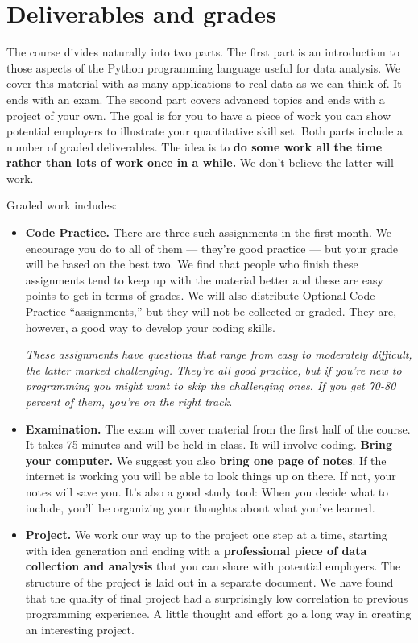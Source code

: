 \documentclass[11pt]{article}
\begin{document}
\section*{Deliverables and grades}

The course divides naturally into two parts.
The first part is an introduction to those aspects of the Python programming language
useful for data analysis.
We cover this material with as many applications to real data as we can think of.
It ends with an exam.
The second part covers advanced topics and ends with a project of your own.
The goal is for you to have a piece of work you can show potential employers to
illustrate your quantitative skill set.
Both parts include a number of graded deliverables.
The idea is to {\bf do some work all the time rather than lots of work once in a while.}
We don't believe the latter will work.

Graded work includes:
%
\begin{itemize}

\item {\bf Code Practice.\/}
There are three such assignments in the first month.
We encourage you do to all of them --- they're good practice ---
but your grade will be based on the best two. We find that people who finish these assignments
tend to keep up with the material better and these are easy points to get in terms of grades.
We will also distribute Optional Code Practice ``assignments,''
but they will not be collected or graded.
They are, however, a good way to develop your coding skills.

{\it These assignments have questions that range from easy to moderately difficult,
the latter marked {\it challenging\/}.
They're all good practice, but if you're new to programming you
might want to skip the challenging ones.
If you get 70-80 percent of them, you're on the right track. \/}

\item {\bf Examination.\/}
The exam will cover material from the first half of the course.
It takes 75 minutes and will be held in class.
It will involve coding.
{\bf Bring your computer.\/}
We suggest you also {\bf bring one page of notes\/}.
If the internet is working you will be able to look things up on there.
If not, your notes will save you.
It's also a good study tool:  When you decide what to include,
you'll be organizing your thoughts about what you've learned.

\item {\bf Project.\/}
We work our way up to the project one step at a time, starting with idea generation and ending
with a {\bf professional piece of data collection and analysis\/}
that you can share with potential employers.
The structure of the project is laid out in a separate document. We have found that the quality
of final project had a surprisingly low correlation to previous programming experience. A little thought and
effort go a long way in creating an interesting project.

\end{itemize}
\end{document}
